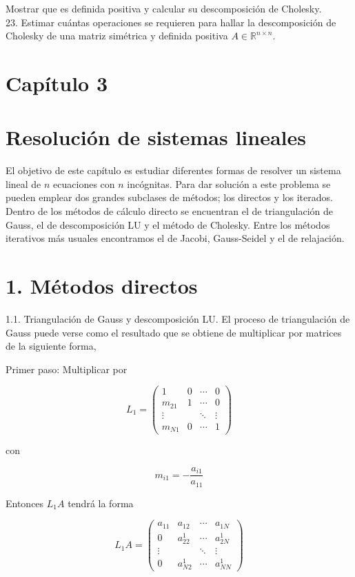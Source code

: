 \documentclass[10pt]{article}
\begin{document}
Mostrar que es definida positiva y calcular su descomposición de Cholesky.\\
23. Estimar cuántas operaciones se requieren para hallar la descomposición de Cholesky de una matriz simétrica y definida positiva $A \in \mathbb{R}^{n \times n}$.

\section*{Capítulo 3}
\section*{Resolución de sistemas lineales}
El objetivo de este capítulo es estudiar diferentes formas de resolver un sistema lineal de $n$ ecuaciones con $n$ incógnitas. Para dar solución a este problema se pueden emplear dos grandes subclases de métodos; los directos y los iterados. Dentro de los métodos de cálculo directo se encuentran el de triangulación de Gauss, el de descomposición LU y el método de Cholesky. Entre los métodos iterativos más usuales encontramos el de Jacobi, Gauss-Seidel y el de relajación.

\section*{1. Métodos directos}
1.1. Triangulación de Gauss y descomposición LU. El proceso de triangulación de Gauss puede verse como el resultado que se obtiene de multiplicar por matrices de la siguiente forma,

Primer paso: Multiplicar por

$$
L_{1}=\left(\begin{array}{cccc}
1 & 0 & \cdots & 0 \\
m_{21} & 1 & \cdots & 0 \\
\vdots & & \ddots & \vdots \\
m_{N 1} & 0 & \cdots & 1
\end{array}\right)
$$

con

$$
m_{i 1}=-\frac{a_{i 1}}{a_{11}}
$$

Entonces $L_{1} A$ tendrá la forma

$$
L_{1} A=\left(\begin{array}{cccc}
a_{11} & a_{12} & \cdots & a_{1 N} \\
0 & a_{22}^{1} & \cdots & a_{2 N}^{1} \\
\vdots & & \ddots & \vdots \\
0 & a_{N 2}^{1} & \cdots & a_{N N}^{1}
\end{array}\right)
$$
\end{document}
